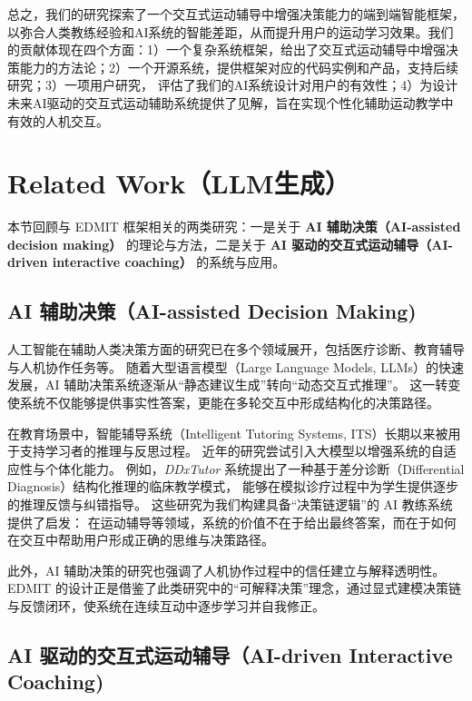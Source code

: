 \documentclass[sigconf]{acmart}
\begin{document}
总之，我们的研究探索了一个交互式运动辅导中增强决策能力的端到端智能框架，以弥合人类教练经验和AI系统的智能差距，从而提升用户的运动学习效果。我们的贡献体现在四个方面：1）一个复杂系统框架，给出了交互式运动辅导中增强决策能力的方法论；2）一个开源系统，提供框架对应的代码实例和产品，支持后续研究；3）一项用户研究， 评估了我们的AI系统设计对用户的有效性；4）为设计未来AI驱动的交互式运动辅助系统提供了见解，旨在实现个性化辅助运动教学中有效的人机交互。

\section{Related Work（LLM生成）}
\label{sec:relatedwork}

本节回顾与 \textsc{EDMIT} 框架相关的两类研究：一是关于 \textbf{AI 辅助决策（AI-assisted decision making）} 的理论与方法，二是关于 \textbf{AI 驱动的交互式运动辅导（AI-driven interactive coaching）} 的系统与应用。

\subsection{AI 辅助决策（AI-assisted Decision Making)}
\label{subsec:aidm}

人工智能在辅助人类决策方面的研究已在多个领域展开，包括医疗诊断、教育辅导与人机协作任务等。  
随着大型语言模型（Large Language Models, LLMs）的快速发展，AI 辅助决策系统逐渐从“静态建议生成”转向“动态交互式推理”\cite{}。  
这一转变使系统不仅能够提供事实性答案，更能在多轮交互中形成结构化的决策路径。

在教育场景中，智能辅导系统（Intelligent Tutoring Systems, ITS）长期以来被用于支持学习者的推理与反思过程\cite{}。  
近年的研究尝试引入大模型以增强系统的自适应性与个体化能力\cite{}。  
例如，\textit{DDxTutor} 系统提出了一种基于差分诊断（Differential Diagnosis）结构化推理的临床教学模式，  
能够在模拟诊疗过程中为学生提供逐步的推理反馈与纠错指导\cite{}。  
这些研究为我们构建具备“决策链逻辑”的 AI 教练系统提供了启发：  
在运动辅导等领域，系统的价值不在于给出最终答案，而在于如何在交互中帮助用户形成正确的思维与决策路径。

此外，AI 辅助决策的研究也强调了人机协作过程中的信任建立与解释透明性\cite{}。  
\textsc{EDMIT} 的设计正是借鉴了此类研究中的“可解释决策”理念，通过显式建模决策链与反馈闭环，使系统在连续互动中逐步学习并自我修正。

\subsection{AI 驱动的交互式运动辅导（AI-driven Interactive Coaching)}
\label{subsec:aicoaching}
\end{document}
